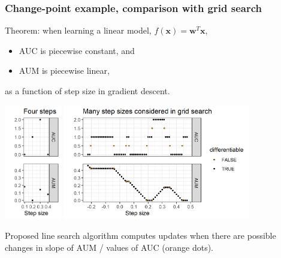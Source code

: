 \documentclass[t]{beamer}
\begin{document}
\begin{frame}
  \frametitle{Change-point example, comparison with grid search}

  Theorem: when learning a linear model, $f(\mathbf x)= \mathbf w^T \mathbf x$,
  \begin{itemize}
  \item AUC is piecewise constant, and
  \item AUM is piecewise linear,
  \end{itemize}
  as a function of step size in gradient descent.
  
\includegraphics[height=5cm]{figure-line-search-example-some}
\includegraphics[height=5cm]{figure-line-search-example-grid}
 
Proposed line search algorithm computes updates when there are
possible changes in slope of AUM / values of AUC (orange dots).

\end{frame}


\end{document}
